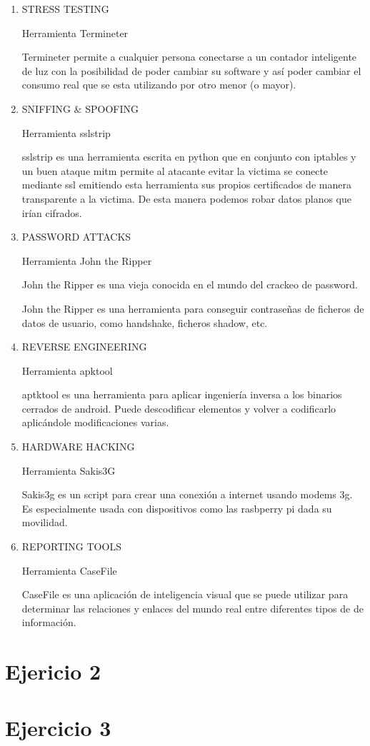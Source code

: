 \documentclass[a4paper]{article}
\begin{document}
\begin{enumerate}
\item STRESS TESTING

Herramienta Termineter

Termineter permite a cualquier persona conectarse a un contador inteligente de luz con la posibilidad de poder cambiar su software y así poder cambiar el consumo real que se esta utilizando por otro menor (o mayor).


\item SNIFFING \& SPOOFING


Herramienta sslstrip

sslstrip es una herramienta escrita en python que en conjunto con iptables y un buen ataque mitm permite al atacante evitar la victima se conecte mediante ssl emitiendo esta herramienta sus propios certificados de manera transparente a la victima. De esta manera podemos robar datos planos que irían cifrados.


\item PASSWORD ATTACKS

Herramienta John the Ripper

John the Ripper es una vieja conocida en el mundo del crackeo de password.

John the Ripper es una herramienta para conseguir contraseñas de ficheros de datos de usuario, como handshake, ficheros shadow, etc. 


\item REVERSE ENGINEERING

Herramienta apktool

aptktool es una herramienta para aplicar ingeniería inversa a los binarios cerrados de android. Puede descodificar elementos y volver a codificarlo aplicándole modificaciones varias.   



\item HARDWARE HACKING

Herramienta Sakis3G

Sakis3g es un script para crear una conexión a internet usando modems 3g. Es especialmente usada con dispositivos como las rasbperry pi dada su movilidad.


\item REPORTING TOOLS

Herramienta CaseFile

CaseFile es una aplicación de inteligencia visual que se puede utilizar para determinar las relaciones y enlaces del mundo real entre diferentes tipos de  de información.



\end{enumerate}

\section{Ejericio  2 }



\section{Ejercicio 3}
\end{document}

